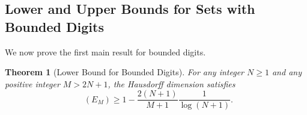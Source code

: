 \documentclass[12pt]{article}
\newtheorem{theorem}{Theorem}[section]
\numberwithin{equation}{section}
\DeclareMathOperator{\dimH}{dim_H}
\begin{document}
\subsection{Lower and Upper Bounds for Sets with Bounded Digits}

We now prove the first main result for bounded digits.

\begin{theorem}[Lower Bound for Bounded Digits] \label{thm:improved-lower}
For any integer $N \geq 1$ and any positive integer $M > 2N+1$, the Hausdorff dimension satisfies
\[
\dimH(E_M) \geq 1 - \frac{2(N+1)}{M+1}\frac{1}{\log(N+1)}.
\]
\end{theorem}
\end{document}
